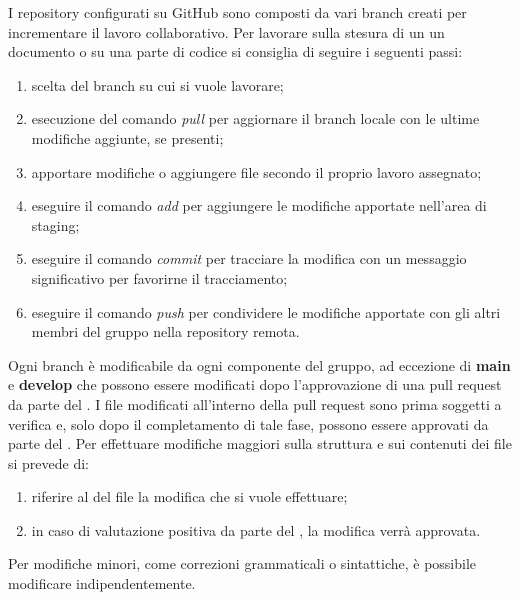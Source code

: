 I repository configurati su GitHub sono composti da vari branch creati per incrementare il lavoro collaborativo. Per lavorare sulla stesura di un un documento o su una parte di codice si consiglia di seguire i seguenti passi:
\begin{enumerate}
	\item scelta del branch su cui si vuole lavorare;
	\item esecuzione del comando \textit{pull} per aggiornare il branch locale con le ultime modifiche aggiunte, se presenti;
	\item apportare modifiche o aggiungere file secondo il proprio lavoro assegnato;
	\item eseguire il comando \textit{add} per aggiungere le modifiche apportate nell'area di staging;
	\item eseguire il comando \textit{commit} per tracciare la modifica con un messaggio significativo per favorirne il tracciamento;
	\item eseguire il comando \textit{push} per condividere le modifiche apportate con gli altri membri del gruppo nella repository remota.
\end{enumerate}

Ogni branch è modificabile da ogni componente del gruppo, ad eccezione di \textbf{main} e \textbf{develop} che possono essere modificati dopo l'approvazione di una pull request da parte del \respProg{}. I file modificati all'interno della pull request sono prima soggetti a verifica e, solo dopo il completamento di tale fase, possono essere approvati da parte del \respProg{}.
Per effettuare modifiche maggiori sulla struttura e sui contenuti dei file si prevede di:
\begin{enumerate}
	\item riferire al \respProg{} del file la modifica che si vuole effettuare;
	\item in caso di valutazione positiva da parte del \respProg{}, la modifica verrà approvata.
\end{enumerate}
Per modifiche minori, come correzioni grammaticali o sintattiche, è possibile modificare indipendentemente. 



